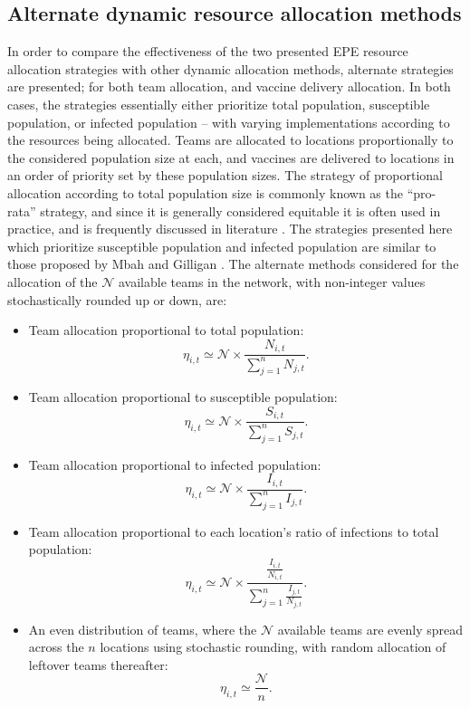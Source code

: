 \documentclass[10pt,letterpaper]{article}
\begin{document}
\subsection*{Alternate dynamic resource allocation methods}
In order to compare the effectiveness of the two presented EPE resource allocation strategies with other dynamic allocation methods, alternate strategies are presented; for both team allocation, and vaccine delivery allocation. In both cases, the strategies essentially either prioritize total population, susceptible population, or infected population -- with varying implementations according to the resources being allocated. Teams are allocated to locations proportionally to the considered population size at each, and vaccines are delivered to locations in an order of priority set by these population sizes. The strategy of proportional allocation according to total population size is commonly known as the ``pro-rata'' strategy, and since it is generally considered equitable it is often used in practice, and is frequently discussed in literature \cite{mbah2011resource,teytelman2013multiregional,duijzer2018dose}. The strategies presented here which prioritize susceptible population and infected population are similar to those proposed by Mbah and Gilligan \cite{mbah2011resource}. The alternate methods considered for the allocation of the $\mathcal{N}$ available teams in the network, with non-integer values stochastically rounded up or down, are:

\begin{itemize}
    \item Team allocation proportional to total population: $$\eta_{i,t} \simeq \mathcal{N} \times \frac{N_{i,t}}{\sum_{j=1}^{n} N_{j,t}}.$$
    \item Team allocation proportional to susceptible population: $$\eta_{i,t} \simeq \mathcal{N} \times \frac{S_{i,t}}{\sum_{j=1}^{n} S_{j,t}}.$$
    \item Team allocation proportional to infected population: $$\eta_{i,t} \simeq \mathcal{N} \times \frac{I_{i,t}}{\sum_{j=1}^{n} I_{j,t}}.$$
    \item Team allocation proportional to each location's ratio of infections to total population: $$\eta_{i,t} \simeq \mathcal{N} \times \frac{\frac{I_{i,t}}{N_{i,t}}}{\sum_{j=1}^{n} \frac{I_{j,t}}{N_{j,t}}}.$$
    \item An even distribution of teams, where the $\mathcal{N}$ available teams are evenly spread across the $n$ locations using stochastic rounding, with random allocation of leftover teams thereafter:
    $$\eta_{i,t} \simeq \frac{\mathcal{N}}{n}.$$
\end{itemize}
\end{document}
